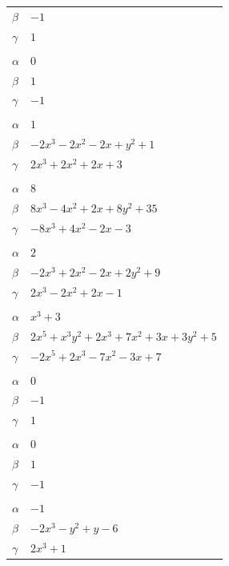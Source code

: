 \documentclass[11pt]{article}
\begin{document}
\begin{longtable}{@{}ll@{}}
$\beta$ & $-1$\\
$\gamma$ & $1$\\
\addlinespace[3pt]
\multicolumn{2}{@{}l}{$\{i,j\}=\{0,2\}$, $k_{ij}=1$}\\
$\alpha$ & $0$\\
$\beta$ & $1$\\
$\gamma$ & $-1$\\
\addlinespace[3pt]
\multicolumn{2}{@{}l}{$\{i,j\}=\{0,7\}$, $k_{ij}=2^{2}$}\\
$\alpha$ & $1$\\
$\beta$ & $-2x^{3}-2x^{2}-2x+y^{2}+1$\\
$\gamma$ & $2x^{3}+2x^{2}+2x+3$\\
\addlinespace[3pt]
\multicolumn{2}{@{}l}{$\{i,j\}=\{0,12\}$, $k_{ij}=5$}\\
$\alpha$ & $8$\\
$\beta$ & $8x^{3}-4x^{2}+2x+8y^{2}+35$\\
$\gamma$ & $-8x^{3}+4x^{2}-2x-3$\\
\addlinespace[3pt]
\multicolumn{2}{@{}l}{$\{i,j\}=\{0,13\}$, $k_{ij}=2^{2}$}\\
$\alpha$ & $2$\\
$\beta$ & $-2x^{3}+2x^{2}-2x+2y^{2}+9$\\
$\gamma$ & $2x^{3}-2x^{2}+2x-1$\\
\addlinespace[3pt]
\multicolumn{2}{@{}l}{$\{i,j\}=\{0,36\}$, $k_{ij}=2\cdot 5$}\\
$\alpha$ & $x^{3}+3$\\
$\beta$ & $2x^{5}+x^{3}y^{2}+2x^{3}+7x^{2}+3x+3y^{2}+5$\\
$\gamma$ & $-2x^{5}+2x^{3}-7x^{2}-3x+7$\\
\addlinespace[3pt]
\multicolumn{2}{@{}l}{$\{i,j\}=\{2,3\}$, $k_{ij}=2$}\\
$\alpha$ & $0$\\
$\beta$ & $-1$\\
$\gamma$ & $1$\\
\addlinespace[3pt]
\multicolumn{2}{@{}l}{$\{i,j\}=\{2,8\}$, $k_{ij}=1$}\\
$\alpha$ & $0$\\
$\beta$ & $1$\\
$\gamma$ & $-1$\\
\addlinespace[3pt]
\multicolumn{2}{@{}l}{$\{i,j\}=\{2,9\}$, $k_{ij}=2^{2}$}\\
$\alpha$ & $-1$\\
$\beta$ & $-2x^{3}-y^{2}+y-6$\\
$\gamma$ & $2x^{3}+1$\\

\end{longtable}
\end{document}
